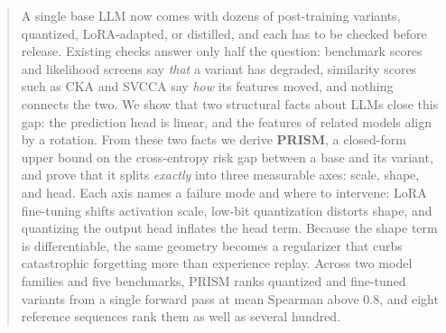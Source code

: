 \documentclass{article} %
\begin{document}

\begin{abstract}
A single base LLM now comes with dozens of post-training variants, quantized, LoRA-adapted, or distilled, and each has to be checked before release.
Existing checks answer only half the question: benchmark scores and likelihood screens say \emph{that} a variant has degraded, similarity scores such as CKA and SVCCA say \emph{how} its features moved, and nothing connects the two.
We show that two structural facts about LLMs close this gap: the prediction head is linear, and the features of related models align by a rotation.
From these two facts we derive \textbf{PRISM}, a closed-form upper bound on the cross-entropy risk gap between a base and its variant, and prove that it splits \emph{exactly} into three measurable axes: scale, shape, and head.
Each axis names a failure mode and where to intervene: LoRA fine-tuning shifts activation scale, low-bit quantization distorts shape, and quantizing the output head inflates the head term.
Because the shape term is differentiable, the same geometry becomes a regularizer that curbs catastrophic forgetting more than experience replay.
Across two model families and five benchmarks, PRISM ranks quantized and fine-tuned variants from a single forward pass at mean Spearman above $0.8$, and eight reference sequences rank them as well as several hundred.
\end{abstract}
\end{document}
